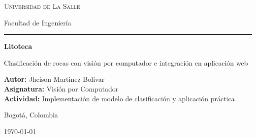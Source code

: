 \documentclass[a4paper,12pt]{article}
\newcommand{\lblAuthor}{Autor}
\newcommand{\lblCourse}{Asignatura}
\begin{document}

  \begin{titlepage}
    \centering
    \vspace*{1.2cm}
    {\scshape\Large Universidad de La Salle \par}
    \vspace{0.35cm}
    {\large Facultad de Ingeniería \par}
    \vspace{0.8cm}
    {\color{reportmark}\rule{4cm}{2.4pt}\par}
    \vspace{1.8cm}
    {\huge\bfseries Litoteca \par}
    \vspace{0.5cm}
    {\Large Clasificación de rocas con visión por computador e integración en aplicación web \par}
    \vspace{2.4cm}
    {\large
      \textbf{\lblAuthor:} Jheison Martinez Bolivar\\[0.35cm]
      \textbf{\lblCourse:} Visión por Computador\\[0.35cm]
      \textbf{Actividad:} Implementación de modelo de clasificación y aplicación práctica\par}
    \vfill
    {\large Bogotá, Colombia \par}
    \vspace{0.25cm}
    {\large \today \par}
    \vspace*{1.0cm}
  \end{titlepage}
\end{document}

